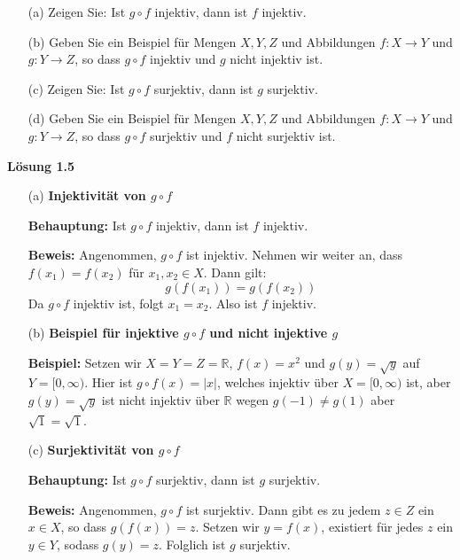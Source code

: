 \documentclass[%
    12pt,
    a4paper,
    ngerman,
    headheight=29.1pt,
]{scrartcl}
\newcommand{\Loesung}[1]{
  {
  \vspace*{0.5cm}
  \textsf{\textbf{Lösung #1}}
  \vspace*{0.2cm}
  }
}
\begin{document}
\begin{enumerate}
    \item[(a)] Zeigen Sie: Ist \( g \circ f \) injektiv, dann ist \( f \) injektiv.
    \item[(b)] Geben Sie ein Beispiel für Mengen \( X, Y, Z \) und Abbildungen \( f : X \rightarrow Y \) und \( g : Y \rightarrow Z \), so dass \( g \circ f \) injektiv und \( g \) nicht injektiv ist.
    \item[(c)] Zeigen Sie: Ist \( g \circ f \) surjektiv, dann ist \( g \) surjektiv.
    \item[(d)] Geben Sie ein Beispiel für Mengen \( X, Y, Z \) und Abbildungen \( f : X \rightarrow Y \) und \( g : Y \rightarrow Z \), so dass \( g \circ f \) surjektiv und \( f \) nicht surjektiv ist.
\end{enumerate}

\Loesung{1.5}\\
\begin{itemize}
    \item[(a)] \textbf{Injektivität von \( g \circ f \)}
    
    \textbf{Behauptung:}
    Ist \( g \circ f \) injektiv, dann ist \( f \) injektiv.

    \textbf{Beweis:}
    Angenommen, \( g \circ f \) ist injektiv. Nehmen wir weiter an, dass \( f(x_1) = f(x_2) \) für \( x_1, x_2 \in X \). Dann gilt:
    \[
    g(f(x_1)) = g(f(x_2))
    \]
    Da \( g \circ f \) injektiv ist, folgt \( x_1 = x_2 \). Also ist \( f \) injektiv.

    \item[(b)] \textbf{Beispiel für injektive \( g \circ f \) und nicht injektive \( g \)}
    
    \textbf{Beispiel:}
    Setzen wir \( X = Y = Z = \mathbb{R} \), \( f(x) = x^2 \) und \( g(y) = \sqrt{y} \) auf \( Y = [0, \infty) \). Hier ist \( g \circ f(x) = |x| \), welches injektiv über \( X = [0, \infty) \) ist, aber \( g(y) = \sqrt{y} \) ist nicht injektiv über \( \mathbb{R} \) wegen \( g(-1) \neq g(1) \) aber \( \sqrt{1} = \sqrt{1} \).

    \item[(c)] \textbf{Surjektivität von \( g \circ f \)}
    
    \textbf{Behauptung:}
    Ist \( g \circ f \) surjektiv, dann ist \( g \) surjektiv.

    \textbf{Beweis:}
    Angenommen, \( g \circ f \) ist surjektiv. Dann gibt es zu jedem \( z \in Z \) ein \( x \in X \), so dass \( g(f(x)) = z \). Setzen wir \( y = f(x) \), existiert für jedes \( z \) ein \( y \in Y \), sodass \( g(y) = z \). Folglich ist \( g \) surjektiv.
\end{itemize}
\end{document}
